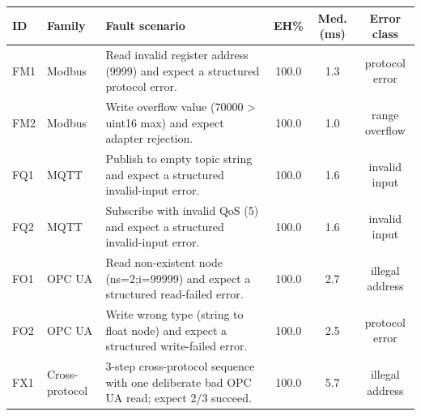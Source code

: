     \begin{tabularx}{\columnwidth}{@{}llYccc@{}}
        \toprule
        ID & Family & Fault scenario & EH\% & Med. (ms) & Error class \\
        \midrule
        FM1 & Modbus & Read invalid register address (9999) and expect a structured protocol error. & 100.0 & 1.3 & protocol error \\
        FM2 & Modbus & Write overflow value (70000 > uint16 max) and expect adapter rejection. & 100.0 & 1.0 & range overflow \\
        FQ1 & MQTT & Publish to empty topic string and expect a structured invalid-input error. & 100.0 & 1.6 & invalid input \\
        FQ2 & MQTT & Subscribe with invalid QoS (5) and expect a structured invalid-input error. & 100.0 & 1.6 & invalid input \\
        FO1 & OPC UA & Read non-existent node (ns=2;i=99999) and expect a structured read-failed error. & 100.0 & 2.7 & illegal address \\
        FO2 & OPC UA & Write wrong type (string to float node) and expect a structured write-failed error. & 100.0 & 2.5 & protocol error \\
        FX1 & Cross-protocol & 3-step cross-protocol sequence with one deliberate bad OPC UA read; expect 2/3 succeed. & 100.0 & 5.7 & illegal address \\
        \bottomrule
    \end{tabularx}

